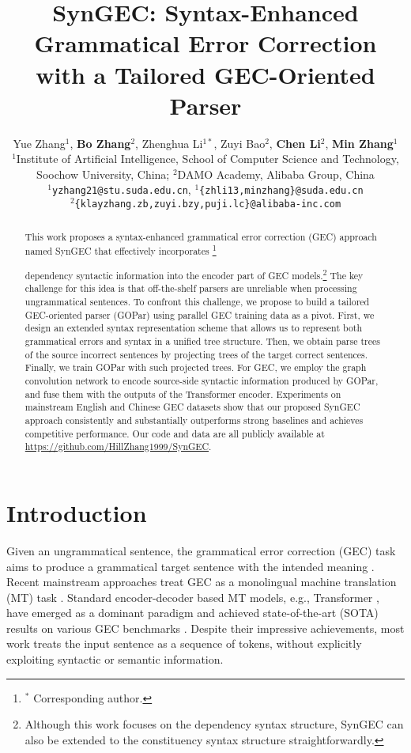 \documentclass[11pt]{article}
\title{SynGEC: Syntax-Enhanced Grammatical Error Correction \\ with a Tailored GEC-Oriented Parser}
\author{Yue Zhang$^{1}$, {\bf Bo Zhang$^2$}, Zhenghua Li$^{1*}$, Zuyi Bao$^2$,   {\bf Chen Li$^2$}, {\bf Min Zhang$^1$} \\
        $^1$Institute of Artificial Intelligence, School of Computer Science and Technology, \\
Soochow University, China; $^2$DAMO Academy, Alibaba Group, China\\
\texttt{$^1$yzhang21@stu.suda.edu.cn}, \texttt{$^1$\{zhli13,minzhang\}@suda.edu.cn}\\\texttt{$^2$\{klayzhang.zb,zuyi.bzy,puji.lc\}@alibaba-inc.com}}
\newcommand\blfootnote[1]{\begingroup
  \renewcommand\thefootnote{}\footnote{#1}\addtocounter{footnote}{-1}\endgroup
}
\begin{document}
\maketitle
\begin{abstract}


This work proposes a syntax-enhanced grammatical error correction (GEC) approach named SynGEC that effectively incorporates \blfootnote{$^*$ Corresponding author.} dependency syntactic information into the encoder part of GEC models.\footnote{Although this work focuses on the dependency syntax structure, SynGEC can also be extended to the constituency syntax structure straightforwardly.} The key challenge for this idea is 
that off-the-shelf parsers are unreliable when processing 
ungrammatical sentences. 
To confront this challenge, we propose to build a tailored GEC-oriented parser (GOPar) using parallel GEC training data as a pivot. 
First, we design an extended syntax representation scheme that allows us to represent both grammatical errors and syntax in a unified tree structure.
Then, we obtain parse trees of the source incorrect sentences by projecting trees of the target correct sentences.
Finally, we train GOPar with such projected trees. 
For GEC, we employ the graph convolution network to encode source-side syntactic information produced by GOPar, and fuse them with the outputs of the Transformer encoder.
Experiments on mainstream English and Chinese GEC datasets show that our proposed SynGEC approach consistently and substantially outperforms strong baselines and achieves competitive performance. Our code and data are all publicly available at \url{https://github.com/HillZhang1999/SynGEC}. 


\end{abstract} 
\section{Introduction}
\label{intro}
Given an ungrammatical sentence, the grammatical error correction (GEC) task aims to produce a grammatical target sentence with the intended meaning \citep{grundkiewicz2020crash,wang2021comprehensive}. Recent mainstream approaches treat GEC as a monolingual machine translation (MT) task  \citep{yuan2016grammatical,junczys2018approaching}. 
Standard encoder-decoder based MT models,  e.g., Transformer \citep{vaswani2017attention}, have emerged as a dominant paradigm and achieved  state-of-the-art (SOTA) results on various GEC benchmarks \citep{rothe2021recipe, stahlberg2021synthetic, sun2022unified, zhang2022mucgec}. 
Despite their impressive achievements, most work treats the input sentence as a sequence of tokens, without explicitly exploiting syntactic or semantic information. 
\end{document}
